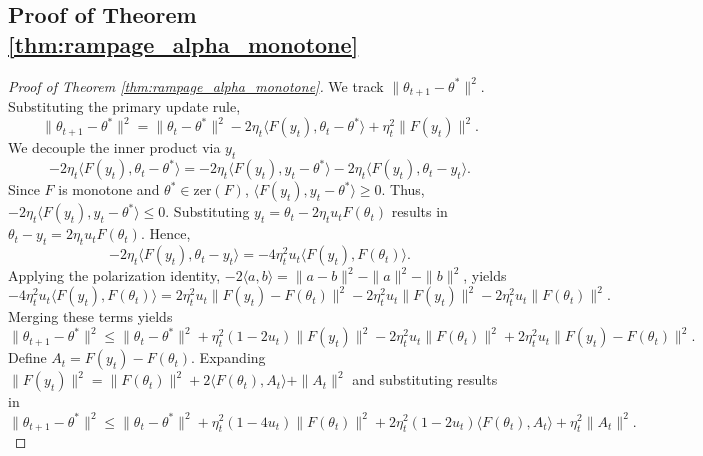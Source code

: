\documentclass[letter,11pt]{article}
\begin{document}
\subsection{Proof of Theorem \ref{thm:rampage_alpha_monotone}}\label{sec:rampage_alpha_monotone}
\begin{proof}[Proof of Theorem \ref{thm:rampage_alpha_monotone}]
We track $\|\theta_{t+1} - \theta^*\|^2$. Substituting the primary update rule,
\begin{equation}
\|\theta_{t+1} - \theta^*\|^2 = \|\theta_t - \theta^*\|^2 - 2\eta_t \langle F(y_t), \theta_t - \theta^* \rangle + \eta_t^2 \|F(y_t)\|^2.
\end{equation}
We decouple the inner product via $y_t$
\begin{equation}
-2\eta_t \langle F(y_t), \theta_t - \theta^* \rangle = -2\eta_t \langle F(y_t), y_t - \theta^* \rangle - 2\eta_t \langle F(y_t), \theta_t - y_t \rangle.
\end{equation}
Since $F$ is monotone and $\theta^* \in \mathrm{zer}(F)$, $\langle F(y_t), y_t - \theta^* \rangle \ge 0$. Thus, $-2\eta_t \langle F(y_t), y_t - \theta^* \rangle \le 0.$
Substituting $y_t = \theta_t - 2\eta_t u_t F(\theta_t)$ results in $\theta_t - y_t = 2\eta_t u_t F(\theta_t)$. Hence,
\begin{equation}
-2\eta_t \langle F(y_t), \theta_t - y_t \rangle = -4\eta_t^2 u_t \langle F(y_t), F(\theta_t) \rangle.
\end{equation}
Applying the polarization identity, $-2\langle a, b \rangle = \|a-b\|^2 - \|a\|^2 - \|b\|^2$, yields
\begin{equation}
-4\eta_t^2 u_t \langle F(y_t), F(\theta_t) \rangle = 2\eta_t^2 u_t \|F(y_t) - F(\theta_t)\|^2 - 2\eta_t^2 u_t \|F(y_t)\|^2 - 2\eta_t^2 u_t \|F(\theta_t)\|^2.
\end{equation}
Merging these terms yields
\begin{equation}
\|\theta_{t+1} - \theta^*\|^2 \le \|\theta_t - \theta^*\|^2 + \eta_t^2(1 - 2u_t)\|F(y_t)\|^2 - 2\eta_t^2 u_t \|F(\theta_t)\|^2 + 2\eta_t^2 u_t \|F(y_t) - F(\theta_t)\|^2.
\end{equation}
Define $A_t = F(y_t) - F(\theta_t)$. Expanding $\|F(y_t)\|^2 = \|F(\theta_t)\|^2 + 2\langle F(\theta_t), A_t \rangle + \|A_t\|^2$ and substituting results in
\begin{equation}
\|\theta_{t+1} - \theta^*\|^2 \le \|\theta_t - \theta^*\|^2 + \eta_t^2(1 - 4u_t)\|F(\theta_t)\|^2 + 2\eta_t^2(1 - 2u_t)\langle F(\theta_t), A_t \rangle + \eta_t^2 \|A_t\|^2.
\end{equation}

\end{proof}
\end{document}
